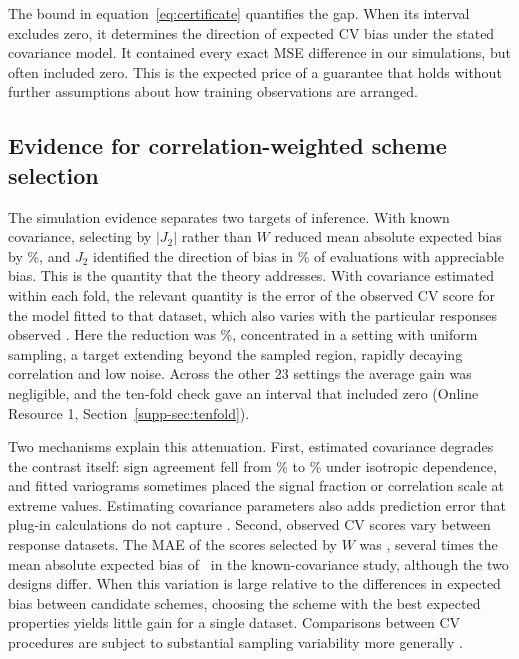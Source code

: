 The bound in equation~\eqref{eq:certificate} quantifies the gap. When its interval excludes zero, it determines the direction of expected CV bias under the stated covariance model. It contained every exact MSE difference in our simulations, but often included zero. This is the expected price of a guarantee that holds without further assumptions about how training observations are arranged.

\subsection{Evidence for correlation-weighted scheme selection}
The simulation evidence separates two targets of inference. With known covariance, selecting by $|J_2|$ rather than $W$ reduced mean absolute expected bias by \BiasReduction\%, and $J_2$ identified the direction of bias in \SignJTwo\% of evaluations with appreciable bias. This is the quantity that the theory addresses. With covariance estimated within each fold, the relevant quantity is the error of the observed CV score for the model fitted to that dataset, which also varies with the particular responses observed \citep{bates2024crossvalidation}. Here the reduction was \NestedReduction\%, concentrated in a setting with uniform sampling, a target extending beyond the sampled region, rapidly decaying correlation and low noise. Across the other 23 settings the average gain was negligible, and the ten-fold check gave an interval that included zero (Online Resource 1, Section~\ref*{supp-sec:tenfold}).

Two mechanisms explain this attenuation. First, estimated covariance degrades the contrast itself: sign agreement fell from \SensIsoTrue\% to \SensIsoEst\% under isotropic dependence, and fitted variograms sometimes placed the signal fraction or correlation scale at extreme values. Estimating covariance parameters also adds prediction error that plug-in calculations do not capture \citep{zimmerman1992mspe}. Second, observed CV scores vary between response datasets. The MAE of the scores selected by $W$ was \NestedMAEW, several times the mean absolute expected bias of \BiasW\ in the known-covariance study, although the two designs differ. When this variation is large relative to the differences in expected bias between candidate schemes, choosing the scheme with the best expected properties yields little gain for a single dataset. Comparisons between CV procedures are subject to substantial sampling variability more generally \citep{lei2020cvc,bates2024crossvalidation}.

